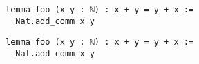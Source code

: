 \documentclass{beamer}
\begin{document}
{\tiny %
\begin{verbatim}
lemma foo (x y : ℕ) : x + y = y + x :=
  Nat.add_comm x y
\end{verbatim}
}

\begin{verbatim}
lemma foo (x y : ℕ) : x + y = y + x :=
  Nat.add_comm x y
\end{verbatim}
\end{document}
